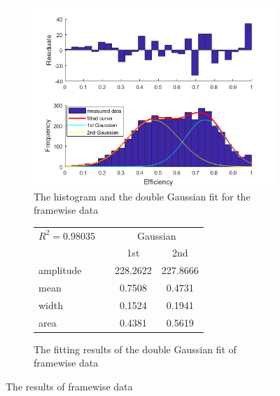 \documentclass[a4paper,english,12pt,bibliography=totoc]{scrreprt}
\begin{document}
\begin{figure}[H]
  \begin{subfigure}{0.45\textwidth}
    \centering
    \includegraphics[width=\textwidth]{framewise_plot.png}
    \caption{The histogram and the double Gaussian fit for the framewise data}
  \end{subfigure}
  \begin{subfigure}{0.45\textwidth}
    \centering

    \begin{tabular}{lccc}
      $R^2 = 0.98035$ &  & \multicolumn{2}{c}{Gaussian} \\ \cline{3-4}
      & & 1st & 2nd \\ 
      \hline
      amplitude &  & 228.2622 & 227.8666 \\
      mean &  & 0.7508  & 0.4731 \\
      width  &  & 0.1524  & 0.1941 \\
      area &  & 0.4381  & 0.5619 
    \end{tabular}

    \caption{The fitting results of the double Gaussian fit of framewise data}
  \end{subfigure}
  \caption{The results of framewise data}
\end{figure}
\end{document}
